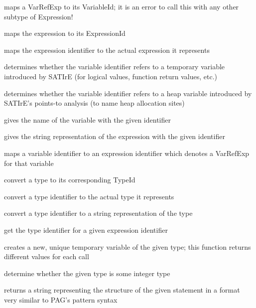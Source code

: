 \documentclass[a4paper,12pt]{report}
\begin{document}
\begin{description}
    maps a VarRefExp to its VariableId; it is an error to call this with any
    other subtype of Expression!

    maps the expression to its ExpressionId

    maps the expression identifier to the actual expression it represents

    determines whether the variable identifier refers to a temporary
    variable introduced by SATIrE (for logical values, function return
    values, etc.)

    determines whether the variable identifier refers to a heap variable
    introduced by SATIrE's points-to analysis (to name heap allocation
    sites)

    gives the name of the variable with the given identifier

    gives the string representation of the expression with the given
    identifier

    maps a variable identifier to an expression identifier which denotes a
    VarRefExp for that variable

    convert a type to its corresponding TypeId

    convert a type identifier to the actual type it represents

    convert a type identifier to a string representation of the type

    get the type identifier for a given expression identifier

    creates a new, unique temporary variable of the given type; this
    function returns different values for each call

    determine whether the given type is some integer type

    returns a string representing the structure of the given statement in a
    format very similar to PAG's pattern syntax


\end{description}
\end{document}

